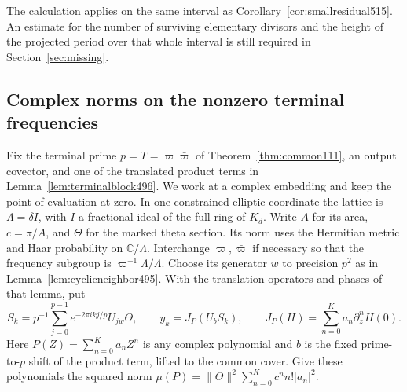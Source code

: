 \documentclass[a4paper,11pt]{article}
\theoremstyle{definition}
\theoremstyle{remark}
\numberwithin{equation}{section}
\begin{document}
The calculation applies on the same interval as
Corollary~\ref{cor:smallresidual515}. An estimate for the number
of surviving elementary divisors and the height of the projected
period over that whole interval is still required in
Section~\ref{sec:missing}.


\subsection{Complex norms on the nonzero terminal frequencies}
\label{sec:terminalnorm518}

Fix the terminal prime \(p=T=\varpi\bar\varpi\) of
Theorem~\ref{thm:common111}, an output covector, and one of the
translated product terms in Lemma~\ref{lem:terminalblock496}.
We work at a complex embedding and keep the point of evaluation at
zero. In one constrained elliptic coordinate the lattice is
\(\Lambda=\delta I\), with \(I\) a fractional ideal of the full ring of
\(K_d\). Write \(A\) for its area, \(c=\pi/A\), and
\(\Theta\) for the marked theta section. Its norm uses the Hermitian
metric and Haar probability on \(\mathbb C/\Lambda\). Interchange
\(\varpi,\bar\varpi\) if necessary so that the frequency subgroup
is \(\varpi^{-1}\Lambda/\Lambda\). Choose its generator \(w\) to
precision \(p^2\) as in Lemma~\ref{lem:cyclicneighbor495}. With the
translation operators and phases of that lemma, put
\[
 S_k=p^{-1}\sum_{j=0}^{p-1} e^{-2\pi i k j/p}U_{jw}\Theta,
 \qquad y_k=J_P(U_b S_k),\qquad
 J_P(H)=\sum_{n=0}^K a_n\partial_z^n H(0).
\]
Here \(P(Z)=\sum_{n=0}^K a_n Z^n\) is any complex polynomial and
\(b\) is the fixed prime-to-\(p\) shift of the product term, lifted
to the common cover. Give these polynomials the squared norm
\(\mu(P)=\|\Theta\|^2\sum_{n=0}^K c^n n!|a_n|^2\).
\end{document}
